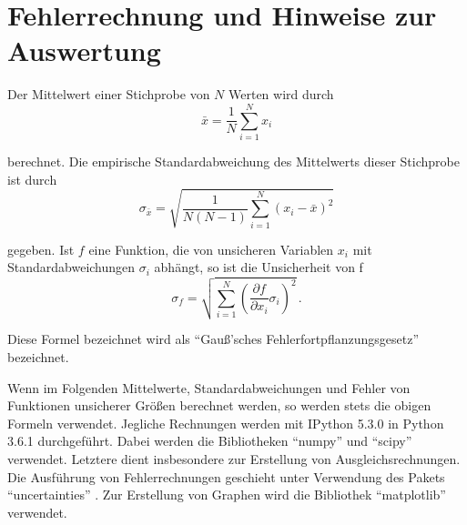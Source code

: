 \section{Fehlerrechnung und Hinweise zur Auswertung}
\label{sec:Fehlerrechnung}
Der Mittelwert einer Stichprobe von $N$ Werten wird durch
\begin{equation}
  \bar{x} = \frac{1}{N} \sum\limits_{i = 1}^N x_i
  \label{eqn:mean}
\end{equation}

berechnet.
Die empirische Standardabweichung des Mittelwerts dieser Stichprobe ist durch
\begin{equation}
  \sigma_{\bar{x}} = \sqrt{\frac{1}{N(N-1)}
    \sum\limits_{i = 1}^N
    (x_i-\bar{x})^2}
    \label{eqn:std}
\end{equation}

gegeben.
Ist $f$ eine Funktion, die von unsicheren Variablen $x_i$ mit
Standardabweichungen $\sigma_i$ abhängt, so ist die Unsicherheit von f
\begin{equation}
  \sigma_f = \sqrt{
    \sum\limits_{i = 1}^N
      \left( \frac{\partial f}{\partial x_i} \sigma_i \right)^{\!\! 2}
  }\,.
  \label{eqn:gaussfehler}
\end{equation}

Diese Formel bezeichnet wird als \enquote{Gauß'sches Fehlerfortpflanzungsgesetz} bezeichnet.


Wenn im Folgenden Mittelwerte, Standardabweichungen und Fehler von
Funktionen unsicherer Größen berechnet werden, so werden stets die obigen
Formeln verwendet.
Jegliche Rechnungen werden mit IPython 5.3.0 in Python 3.6.1 durchgeführt. Dabei
werden die Bibliotheken \enquote{numpy} \cite{numpy} und \enquote{scipy} \cite{scipy} verwendet.
Letztere dient insbesondere zur Erstellung von Ausgleichsrechnungen.
Die Ausführung von Fehlerrechnungen geschieht unter Verwendung des Pakets
\enquote{uncertainties} \cite{uncertainties}. Zur Erstellung von Graphen wird die Bibliothek
\enquote{matplotlib} \cite{matplotlib} verwendet.
